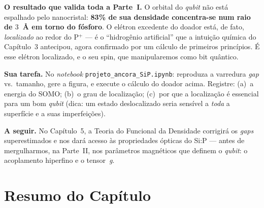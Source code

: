 \documentclass[11pt,a4paper,openany]{book}
\newcommand{\code}[1]{\texttt{#1}}
\newcommand{\qubit}{\emph{qubit}}
\begin{document}
\begin{caixaancora}
\textbf{O resultado que valida toda a Parte~I.} O orbital do \qubit{} não está
espalhado pelo nanocristal: \textbf{83\% de sua densidade concentra-se num raio de
$3$~Å em torno do fósforo}. O elétron excedente do doador está, de fato,
\emph{localizado} ao redor do P$^+$ --- é o ``hidrogênio artificial'' que a
intuição química do Capítulo~3 antecipou, agora confirmado por um cálculo de
primeiros princípios. É esse elétron localizado, e o seu spin, que
manipularemos como bit quântico.

\vspace{0.3cm}
\textbf{Sua tarefa.} No \emph{notebook} \code{projeto\_ancora\_SiP.ipynb}:
reproduza a varredura \emph{gap} vs.\ tamanho, gere a figura, e execute o cálculo
do doador acima. Registre: (a)~a energia do SOMO; (b)~o grau de localização;
(c)~por que a localização é essencial para um bom \qubit{} (dica: um estado
deslocalizado seria sensível a \emph{toda} a superfície e a suas imperfeições).

\vspace{0.3cm}
\textbf{A seguir.} No Capítulo~5, a Teoria do Funcional da Densidade corrigirá os
\emph{gaps} superestimados e nos dará acesso às propriedades ópticas do Si:P ---
antes de mergulharmos, na Parte~II, nos parâmetros magnéticos que definem o
\qubit{}: o acoplamento hiperfino e o tensor~\emph{g}.
\end{caixaancora}

\section*{Resumo do Capítulo}
\end{document}
